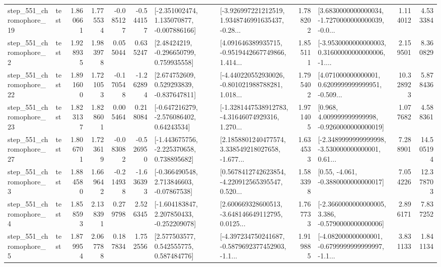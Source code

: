 \begin{tabular}{llrrrrllrlrr}
  step\_551\_chromophore\_19 &      test &      1.860661 &    1.775534 &     -0.085127 & -0.544157 &   [-2.351002474, 1.135070877, -0.007886166] &  [-3.926997221212519, 1.9348746991635437, -0.28... &       1.788202 &  [3.6830000000000034, -1.7270000000000039, -0.0... &            1.114012 &          4.533384 \\
   step\_551\_chromophore\_2 &      test &      1.928935 &    1.983978 &      0.055044 &  0.635247 &     [2.48424219, -0.296650799, 0.759935558] &  [4.091646389935715, -0.9519442667749866, 1.414... &       1.855111 &  [-3.9530000000000003, 0.31600000000000006, -1.... &            2.159501 &          8.360829 \\
  step\_551\_chromophore\_22 &      test &      1.891600 &    1.721053 &     -0.170548 & -1.262894 &    [2.674752609, 0.529293839, -0.837647811] &  [-4.440220552930026, -0.801021988788281, 1.018... &       1.795402 &  [4.071000000000001, 0.6209999999999951, -0.509... &           10.328923 &          5.878436 \\
  step\_551\_chromophore\_23 &      test &      1.823137 &    1.828601 &      0.005464 &  0.218084 &    [-0.647216279, -2.576086402, 0.64243534] &  [-1.3281447538912783, -4.31646074929316, 1.270... &       1.971405 &    [0.968, 4.009999999999998, -0.9260000000000019] &            1.077682 &          4.588361 \\
  step\_551\_chromophore\_27 &      test &      1.806701 &    1.723619 &     -0.083082 & -0.526950 &   [-1.443675756, -2.225370658, 0.738895682] &  [2.1858801240477574, 3.338549218027658, -1.677... &       1.634533 &  [-2.3489999999999998, -3.530000000000001, 0.61... &            7.288901 &         14.505194 \\
   step\_551\_chromophore\_3 &      test &      1.884580 &    1.669642 &     -0.214938 & -1.636393 &    [-0.366490548, 2.713846603, -0.07867538] &  [0.5678412742623854, -4.220912565395547, 0.520... &       1.583398 &                [0.55, -4.061, -0.3880000000000017] &            7.054226 &         12.378703 \\
   step\_551\_chromophore\_4 &      test &      1.858593 &    2.138391 &      0.279798 &  2.526345 &   [-1.604183847, 2.207850433, -0.252209078] &  [2.600669328600513, -3.648146649112795, 0.0125... &       1.767733 &  [-2.3660000000000005, 3.386, -0.5790000000000006] &            2.896171 &          7.837252 \\
   step\_551\_chromophore\_5 &      test &      1.879954 &    2.067788 &      0.187834 &  1.752556 &     [2.577503577, 0.542555775, 0.587484776] &  [-4.397234750241687, -0.5879692377452903, -1.1... &       1.919885 &  [-4.082000000000001, -0.6799999999999997, -1.1... &            3.831133 &          1.841134 \\

\end{tabular}
